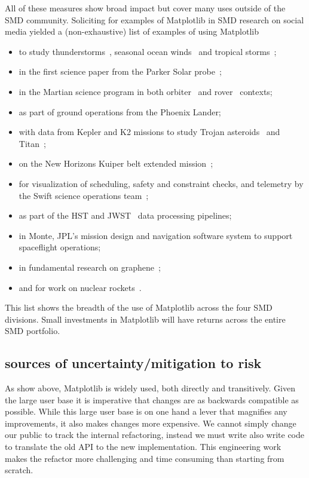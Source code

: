 \documentclass[12pt]{article}
\numberwithin{page}{section}
\begin{document}
All of these measures show broad impact but cover many uses outside of
the SMD community.  Soliciting for examples of
Matplotlib in SMD research on social media yielded a (non-exhaustive)
list of examples of using Matplotlib
\begin{itemize}
\item
  to study
  thunderstorms~\cite{https://doi.org/10.1002/2016JD025299,https://doi.org/10.1029/2019JD030874},
  seasonal ocean winds~\cite{https://doi.org/10.1002/2017JD027516} and
  tropical storms~\cite{Lang_2020};
\item in the first science paper from the Parker Solar
  probe~\cite{Bale2019};
\item in the Martian science program in both
  orbiter~\cite{https://doi.org/10.1029/2019JE006188} and
  rover~\cite{https://doi.org/10.1002/2016EA000219} contexts;
\item as part of ground operations from the Phoenix Lander;
\item with data from Kepler and K2 missions to study Trojan
  asteroids~\cite{Nixon_2019} and
  Titan~\cite{Ryan_2017,2019PASP..131h4505P};
\item on the New Horizons Kuiper belt extended
  mission~\cite{Porter_2018};
\item for visualization of scheduling, safety and constraint checks,
  and telemetry by the Swift science operations
  team~\cite{swift_ops,2020ApJ...900...35T};
\item as part of the HST and JWST~\cite{jwst_pipeline} data processing
  pipelines;
\item in Monte, JPL's mission design
  and navigation software system to support spaceflight operations;
\item in fundamental research on graphene~\cite{PhysRevLett.120.236802};
\item and for work on nuclear rockets~\cite{leu_cerment}.
\end{itemize}
This list shows the breadth of the use of Matplotlib across the
four SMD divisions.  Small investments in Matplotlib will have returns
across the entire SMD portfolio.

\subsection{sources of uncertainty/mitigation to risk}

As show above, Matplotlib is widely used, both directly and
transitively.  Given the large user base it is imperative that changes
are as backwards compatible as possible.  While this large user base
is on one hand a lever that magnifies any improvements, it also makes
changes more expensive.  We cannot simply change our public to track
the internal refactoring, instead we must write also write code to
translate the old API to the new implementation.  This engineering work
makes the refactor more challenging and time consuming than starting
from scratch.
\end{document}
